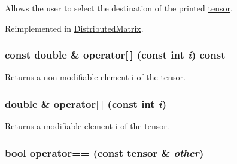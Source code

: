 Allows the user to select the destination of the printed \hyperlink{classJKBuilder_1_1tensor}{tensor}. 

Reimplemented in \hyperlink{classJKBuilder_1_1DistributedMatrix_a74b2fe351a5444c1325870dc6162f451}{DistributedMatrix}.\hypertarget{classJKBuilder_1_1tensor_a4f0dc1b84b580cec49500c70f87e084a}{
\subsubsection[{operator[]}]{\setlength{\rightskip}{0pt plus 5cm}const double \& operator\mbox{[}$\,$\mbox{]} (const int {\em i}) const}}
\label{classJKBuilder_1_1tensor_a4f0dc1b84b580cec49500c70f87e084a}


Returns a non-\/modifiable element i of the \hyperlink{classJKBuilder_1_1tensor}{tensor}. \hypertarget{classJKBuilder_1_1tensor_a38c9fed6b117f7cf8b76785648d76b62}{
\subsubsection[{operator[]}]{\setlength{\rightskip}{0pt plus 5cm}double \& operator\mbox{[}$\,$\mbox{]} (const int {\em i})}}
\label{classJKBuilder_1_1tensor_a38c9fed6b117f7cf8b76785648d76b62}


Returns a modifiable element i of the \hyperlink{classJKBuilder_1_1tensor}{tensor}. \hypertarget{classJKBuilder_1_1tensor_a10ae0b61e655854d12c6465d2b9e3506}{
\subsubsection[{operator==}]{\setlength{\rightskip}{0pt plus 5cm}bool operator== (const {\bf tensor} \& {\em other})}}
\label{classJKBuilder_1_1tensor_a10ae0b61e655854d12c6465d2b9e3506}


